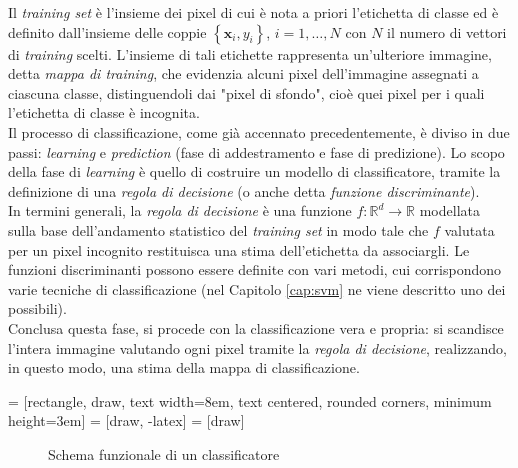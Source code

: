 Il \emph{training set} è l'insieme dei pixel di cui è nota a priori l'etichetta di classe ed è definito dall'insieme delle coppie $\left\lbrace \mathbf{x}_i,y_i \right\rbrace $, $i=1,\ldots,N$ con $N$ il numero di vettori di \emph{training} scelti. L'insieme di tali etichette rappresenta un'ulteriore immagine, detta  \emph{mappa di training}, che evidenzia alcuni pixel dell'immagine assegnati a ciascuna classe, distinguendoli dai "pixel di sfondo", cioè quei pixel per i quali l'etichetta di classe è incognita.
\\
Il processo di classificazione, come già accennato precedentemente, è diviso in due passi: \emph{learning} e \emph{prediction} (fase di addestramento e fase di predizione). Lo scopo della fase di \emph{learning} è quello di costruire un modello di classificatore, tramite la definizione di una \emph{regola di decisione} (o anche detta \emph{funzione discriminante}). \\
In termini generali, la \emph{regola di decisione} è una funzione $f:\mathbb{R}^d\rightarrow\mathbb{R}$ modellata sulla base dell'andamento statistico del \emph{training set} in modo tale che $f$ valutata per un pixel incognito restituisca una stima dell'etichetta da associargli. Le funzioni discriminanti possono essere definite con vari metodi, cui corrispondono varie tecniche di classificazione (nel Capitolo \ref{cap:svm} ne viene descritto uno dei possibili). \\
Conclusa questa fase, si procede con la classificazione vera e propria: si scandisce l'intera immagine valutando ogni pixel tramite la \emph{regola di decisione}, realizzando, in questo modo, una stima della mappa di classificazione.\\
\vspace{2cm}

 = [rectangle, draw, %
     text width=8em, text centered, rounded corners, minimum height=3em]
 = [draw, -latex]
 = [draw]


\begin{figure}[!ht]
\center
{}
    \caption{Schema funzionale di un classificatore}
    \label{fig:flowchart_classificatore}
  \end{figure}
\clearpage


